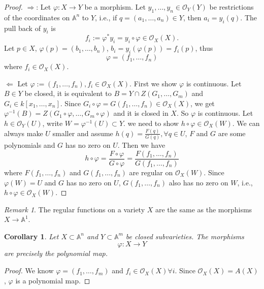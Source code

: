\documentclass{amsart}
\theoremstyle{plain}
\newtheorem{corollary}{Corollary}
\theoremstyle{definition}
\theoremstyle{remark}
\newtheorem*{remark}{Remark}
\numberwithin{equation}{section}
\begin{document}
 \begin{proof}
 	$ \Rightarrow $: Let $ \varphi :X\to Y $ be a morphism. Let $ y_1,\dots, y_n \in \mathcal{O}_Y(Y)$ be restrictions of the coordinates on $ \mathbb{A}^n $ to $ Y $, i.e., if $ q=(a_1,\dots,a_n)\in Y $, then $ a_i=y_i(q) $. The pull back of $ y_i $ is
 	\begin{equation}
 	f_i:=\varphi^\ast y_i=y_i\circ \varphi \in \mathcal{O}_X(X).
 	\end{equation}
 	Let $ p\in X $, $ \varphi(p)=(b_1,\dots,b_n) $, $ b_i=y_i(\varphi(p))=f_i(p) $, thus
 	$$
 	\varphi= (f_1,\dots,f_n)
 	$$
 	where $ f_i\in \mathcal{O}_X(X) $.
 	
 	$ \Leftarrow $ Let $ \varphi :=(f_1,\dots,f_n),f_i\in \mathcal{O}_X(X) $. First we show $ \varphi  $  is continuous. Let $ B\in Y $ be closed, it is equivalent to $ B=Y\cap Z(G_1,\dots,G_m) $ and $ G_i\in k[x_1,\dots,x_n] $. Since
 	$ G_i\circ \varphi = G(f_1,\dots,f_n)\in \mathcal{O}_X(X) $, we get $ \varphi^{-1}(B)=Z(G_1\circ \varphi,\dots,G_m\circ\varphi) $ and it is closed in $ X $. So $ \varphi $ is continuous. Let $ h\in \mathcal{O}_Y(U) $, write $ W=\varphi^{-1}(U)\subset Y $. we need to show $ h\circ \varphi \in \mathcal{O}_X(W) $. We can always make $ U $ smaller and assume $ h(q)=\frac{F(q)}{G(q)} ,\forall q\in U$, $ F $ and $ G $ are some polynomials and $ G $ has no zero on $ U $. Then we have
 	\begin{equation}
 	h\circ \varphi =\frac{F\circ \varphi}{G\circ \varphi}=\frac{F(f_1,\dots,f_n)}{G(f_1,\dots,f_n)}
 	\end{equation}
 	where $ F(f_1,\dots,f_n) $ and $ G(f_1,\dots,f_n) $ are regular on $ \mathcal{O}_X(W) $. Since $ \varphi(W)=U $ and $ G $ has no zero on $ U $, $ G(f_1,\dots,f_n) $ also has no zero on $ W $, i.e., $ h\circ \varphi\in \mathcal{O}_X(W) $.
 \end{proof}
 \begin{remark}
 	The regular functions on a variety $ X $ are the same as the morphisms $ X\to \mathbb{A}^1 $.
 \end{remark}
 \begin{corollary}
 	Let $ X\subset \mathbb{A}^n $ and $ Y\subset \mathbb{A}^m $ be closed subvarieties. The morphisms
 	$$
 	\varphi:X\to Y
 	$$
 	are precisely the polynomial map.
 \end{corollary}
 \begin{proof}
 	We know $ \varphi=(f_1,\dots,f_m) $ and $ f_i\in \mathcal{O}_X(X) \forall i$. Since $ \mathcal{O}_X(X)=A(X) $, $ \varphi $ is a polynomial map.
 \end{proof}
\end{document}

